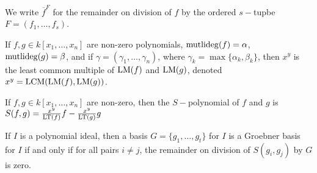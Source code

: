 \documentclass[../main.tex]{subfiles}
\begin{document}
\begin{notation}
We write $\overline{f}^{F}$ for the remainder on division of $f$ by the ordered $s-$tupbe $F = (f_1,\hdots, f_s)$.
\end{notation}

\begin{definition}
If $f,g\in k[x_1,\hdots ,x_n]$ are non-zero polynomials, $\operatorname{mutlideg}(f) = \alpha$, $\operatorname{mutlideg}(g) = \beta$, and if $\gamma = (\gamma_1,\hdots, \gamma_n)$, where $\gamma_k = \max\{\alpha_k,\beta_k\}$, then $x^y$ is the least common multiple of $\operatorname{LM}(f)$ and $\operatorname{LM}(g)$, denoted $x^y = \operatorname{LCM}(\operatorname{LM}(f),\operatorname{LM}(g))$.
\end{definition}

\begin{definition}
If $f,g\in k[x_1,\hdots ,x_n]$ are non-zero, then the $S-$polynomial of $f$ and $g$ is $S(f,g) = \frac{x^y}{\operatorname{LT}(f)}f - \frac{x^y}{\operatorname{LT}(g)}g$
\end{definition}

\begin{theorem}
If $I$ is a polynomial ideal, then a basis $G=\{g_1,\hdots, g_t\}$ for $I$ is a Groebner basis for $I$ if and only if for all pairs $i\ne j$, the remainder on division of $S(g_i,g_j)$ by $G$ is zero.
\end{theorem}
\end{document}
